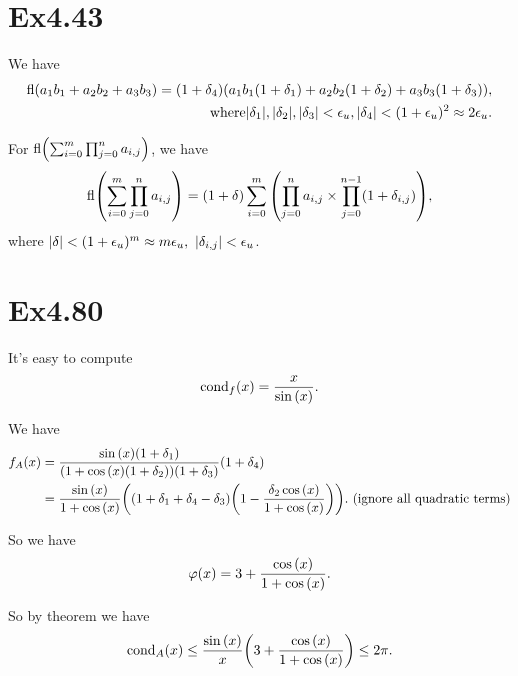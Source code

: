 \documentclass[a4paper]{article}
\begin{document}
\section*{Ex4.43}

We have
\begin{equation}
    \begin{aligned}
        \mathrm{fl} (a_1b_1 + a_2b_2 + a_3b_3) = (1+\delta_4) \qty(a_1b_1 \qty(1+\delta_1) + a_2b_2 \qty(1+\delta_2) + a_3b_3 \qty(1+\delta_3)), \\
        \mathrm{where} \abs{\delta_1}, \abs{\delta_2}, \abs{\delta_3} < \epsilon_u, \abs{\delta_4} < (1+\epsilon_u)^2 \approx 2 \epsilon_u.
    \end{aligned}
\end{equation}

For $\mathrm{fl}\qty( \sum_{i=0}^{m} \prod_{j=0}^{n} a_{i,j} )$, we have
\begin{equation}
    \mathrm{fl}\qty( \sum_{i=0}^{m} \prod_{j=0}^{n} a_{i,j} ) = (1+\delta) \sum_{i=0}^{m} \qty(\prod_{j=0}^{n} a_{i,j} \times \prod_{j=0}^{n-1}(1+\delta_{i,j})),
\end{equation}
where $\abs{\delta} < (1+\epsilon_u)^m \approx m \epsilon_u,~ \abs{\delta_{i,j}} < \epsilon_u$.


\section*{Ex4.80}

It's easy to compute 
\begin{equation}
    \mathrm{cond}_f(x) = \frac{x}{\sin\qty(x)}. 
\end{equation}

We have 
\begin{equation}
    \begin{aligned}
        f_A(x) &= \frac{\sin\qty(x) (1+\delta_1)}{\qty(1+ \cos\qty(x) \qty(1+\delta_2)) \qty(1+\delta_3)} \qty(1+\delta_4) \\
        &= \frac{\sin\qty(x)}{1+\cos\qty(x)}\qty(\qty(1+\delta_1+\delta_4-\delta_3) \qty(1- \frac{\delta_2 \cos\qty(x)}{1+\cos\qty(x)})). ~ (\text{ignore all quadratic terms})
    \end{aligned}
\end{equation}

So we have 
\begin{equation}
    \varphi(x) = 3 + \frac{\cos\qty(x)}{1+\cos\qty(x)}. 
\end{equation}

So by theorem we have 
\begin{equation}
    \mathrm{cond}_A(x) \leq \frac{\sin\qty(x)}{x} \qty(3 + \frac{\cos\qty(x)}{1+\cos\qty(x)}) \leq 2 \pi.
\end{equation}
\end{document}
